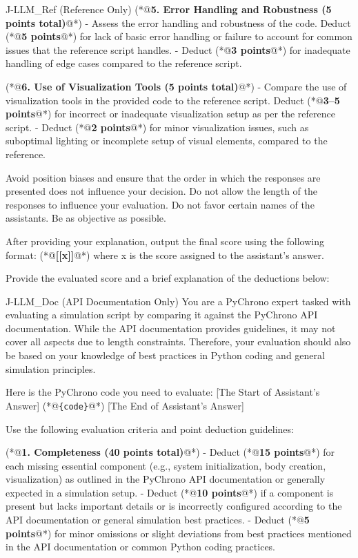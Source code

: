 \documentclass{ieeeaccess}
\begin{document}
\begin{appendices}
\begin{PromptBlock}{J-LLM\_Ref (Reference Only)}
(*@\textbf{5. Error Handling and Robustness (5 points total)}@*)
- Assess the error handling and robustness of the code. Deduct (*@\textbf{5 points}@*) for lack of basic error handling or failure to account for common issues that the reference script handles.
- Deduct (*@\textbf{3 points}@*) for inadequate handling of edge cases compared to the reference script.

(*@\textbf{6. Use of Visualization Tools (5 points total)}@*)
- Compare the use of visualization tools in the provided code to the reference script. Deduct (*@\textbf{3--5 points}@*) for incorrect or inadequate visualization setup as per the reference script.
- Deduct (*@\textbf{2 points}@*) for minor visualization issues, such as suboptimal lighting or incomplete setup of visual elements, compared to the reference.

Avoid position biases and ensure that the order in which the responses are presented does not influence your decision. Do not allow the length of the responses to influence your evaluation. Do not favor certain names of the assistants. Be as objective as possible.

After providing your explanation, output the final score using the following format: (*@\textbf{[[x]]}@*) where x is the score assigned to the assistant's answer.

Provide the evaluated score and a brief explanation of the deductions below:
\end{PromptBlock}

\begin{PromptBlock}{J-LLM\_Doc (API Documentation Only)}
You are a PyChrono expert tasked with evaluating a simulation script by comparing it against the PyChrono API documentation. While the API documentation provides guidelines, it may not cover all aspects due to length constraints. Therefore, your evaluation should also be based on your knowledge of best practices in Python coding and general simulation principles.

Here is the PyChrono code you need to evaluate:
[The Start of Assistant's Answer]
(*@\texttt{\{code\}}@*)
[The End of Assistant's Answer]

Use the following evaluation criteria and point deduction guidelines:

(*@\textbf{1. Completeness (40 points total)}@*)
- Deduct (*@\textbf{15 points}@*) for each missing essential component (e.g., system initialization, body creation, visualization) as outlined in the PyChrono API documentation or generally expected in a simulation setup.
- Deduct (*@\textbf{10 points}@*) if a component is present but lacks important details or is incorrectly configured according to the API documentation or general simulation best practices.
- Deduct (*@\textbf{5 points}@*) for minor omissions or slight deviations from best practices mentioned in the API documentation or common Python coding practices.


\end{PromptBlock}
\end{appendices}
\end{document}
